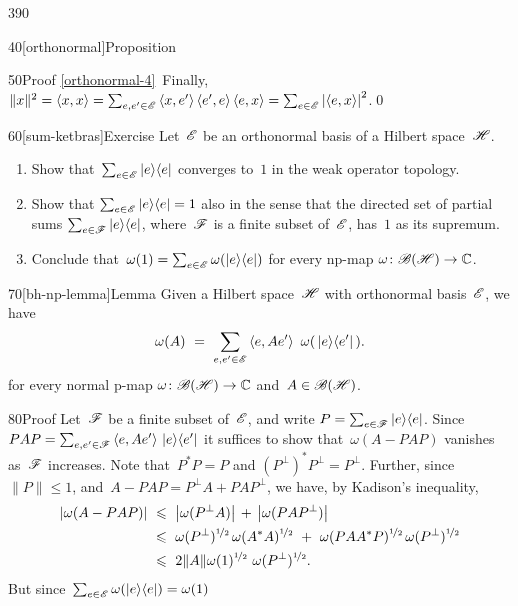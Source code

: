 \begin{parsec}{390}
\begin{point}{40}[orthonormal]{Proposition}
\begin{point}{50}{Proof}
\ref{orthonormal-4}\ 
Finally,
$\|x\|^2=\left<x,x\right>
= \sum_{e,e'\in\mathscr{E}}
\left<x,e'\right>\left<e',e\right>\left<e,x\right>
= \sum_{e\in \mathscr{E}} \left|\left<e,x\right>\right|^2$.\qed
\end{point}
\end{point}
\begin{point}{60}[sum-ketbras]{Exercise}%
Let~$\mathscr{E}$ be an orthonormal basis of a Hilbert space~$\mathscr{H}$.
\begin{enumerate}
\item
Show that~$\sum_{e\in\mathscr{E}} \left|e\right>\!\left<e\right|$
converges to~$1$
in the weak operator topology.
\item
Show that $\sum_{e\in\mathscr{E}}\left|e\right>\!\left<e\right|=1$
also in the sense
that the directed
set of partial sums
$\sum_{e\in \mathscr{F}} \left|e\right>\!\left<e\right|$,
where~$\mathscr{F}$ is a finite subset of~$\mathscr{E}$,
has~$1$ as its supremum.
\item
Conclude that~$\omega(1)=\sum_{e\in\mathscr{E}} \omega(\left|e\right>\!\left<e\right|)$
for every np-map $\omega\colon \mathscr{B}(\mathscr{H})\to\mathbb{C}$.
\end{enumerate}
\spacingfix%
\end{point}%
\begin{point}{70}[bh-np-lemma]{Lemma}%
Given a Hilbert space~$\mathscr{H}$
with orthonormal basis~$\mathscr{E}$,
we have
\begin{equation*}
	\omega(A)\ = \ 
	\sum_{e,e'\in\scrE} \left<e,Ae'\right>\ \omega(\,\ketbra{e}{e'}\,).
\end{equation*}
for every normal p-map $\omega\colon \mathscr{B}(\mathscr{H})\to\mathbb{C}$
and~$A\in\mathscr{B}(\mathscr{H})$.
\begin{point}{80}{Proof}%
Let~$\mathscr{F}$ be a finite subset of~$\mathscr{E}$,
and write $P=\sum_{e\in \mathscr{F}} \left|e\right>\!\left<e\right|$.
Since $PAP
= \sum_{e,e'\in\mathscr{F}}\left<e,Ae'\right>\,\left|e\right>\!\left<e'\right|$
it suffices
to show that~$\omega(A-PAP)$
vanishes as~$\mathscr{F}$ increases.
Note that~$P^*P=P$ and
$(P^\perp)^*P^\perp=P^\perp$.
Further,
since
$\|P\|\leq 1$,
and~$A-PAP=P^\perp A + PAP^\perp$,
we have,
by Kadison's inequality,
\begin{alignat*}{3}
\left|\omega(A-PAP)\right|
\ &\leq\  \left|\omega(P^\perp A)\right| \,+\,\left|\omega(PAP^\perp)\right| \\
\ &\leq\  
\omega(P^\perp)^{\nicefrac{1}{2}}\,
\omega(A^*A)^{\nicefrac{1}{2}}
\ +\ 
\omega(PAA^*P)^{\nicefrac{1}{2}}\,
\omega(P^\perp)^{\nicefrac{1}{2}}\\
\ &\leq\  
2\|A\| 
\omega(1)^{\nicefrac{1}{2}}\ 
\omega(P^\perp)^{\nicefrac{1}{2}}.
\end{alignat*}
But since~$\sum_{e\in\mathscr{E}} \omega(\left|e\right>\!\left<e\right|)=\omega(1)$

\end{point}
\end{point}
\end{parsec}
